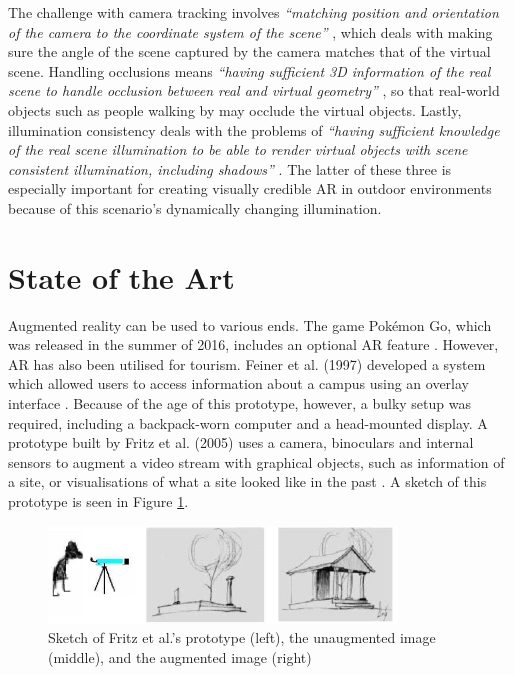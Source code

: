 The challenge with camera tracking involves \textit{“matching position and orientation of the camera to the coordinate system of the scene”} \cite{Lal2010}, which deals with making sure the angle of the scene captured by the camera matches that of the virtual scene. Handling occlusions means \textit{“having sufficient 3D information of the real scene to handle occlusion between real and virtual geometry”} \cite{Lal2010}, so that real-world objects such as people walking by may occlude the virtual objects. Lastly, illumination consistency deals with the problems of \textit{“having sufficient knowledge of the real scene illumination to be able to render virtual objects with scene consistent illumination, including shadows”} \cite{Lal2010}. The latter of these three is especially important for creating visually credible AR in outdoor environments because of this scenario’s dynamically changing illumination.

\section{State of the Art}
Augmented reality can be used to various ends. The game Pokémon Go, which was released in the summer of 2016, includes an optional AR feature \cite{Pokemon}. However, AR has also been utilised for tourism. Feiner et al. (1997) developed a system which allowed users to access information about a campus using an overlay interface \cite{Feiner1997}. Because of the age of this prototype, however, a bulky setup was required, including a backpack-worn computer and a head-mounted display. A prototype built by Fritz et al. (2005) uses a camera, binoculars and internal sensors to augment a video stream with graphical objects, such as information of a site, or visualisations of what a site looked like in the past \cite{Fritz2005}. A sketch of this prototype is seen in Figure \ref{fig:binoculars}.

\begin{figure}[h!]
    \centering
    \includegraphics[scale=0.7]{figures/binoc.png}
    \caption{Sketch of Fritz et al.'s prototype (left), the unaugmented image (middle), and the augmented image (right) \cite{Fritz2005}}\label{fig:binoculars}
\end{figure}

